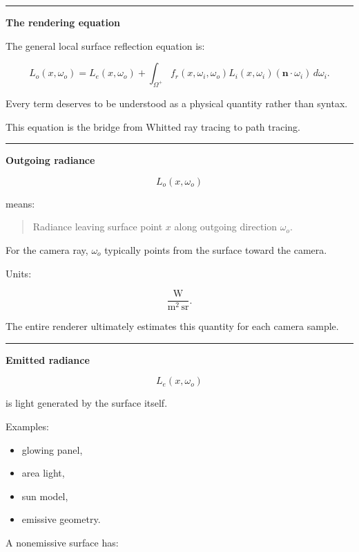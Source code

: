 \begin{center}\rule{0.5\linewidth}{0.5pt}\end{center}

\textbf{The rendering equation}

The general local surface reflection equation is:

\[
\boxed{
L_o(x,\omega_o)
=
L_e(x,\omega_o)
+
\int_{\Omega^+}
f_r(x,\omega_i,\omega_o)
L_i(x,\omega_i)
(\mathbf n\cdot\omega_i)
\,d\omega_i.
}
\]

Every term deserves to be understood as a physical quantity rather than syntax.

This equation is the bridge from Whitted ray tracing to path tracing.

\begin{center}\rule{0.5\linewidth}{0.5pt}\end{center}

\textbf{Outgoing radiance}

\[
L_o(x,\omega_o)
\]

means:

\begin{quote}
Radiance leaving surface point \(x\) along outgoing direction \(\omega_o\).
\end{quote}

For the camera ray, \(\omega_o\) typically points from the surface toward the camera.

Units:

\[
\frac{\mathrm W}
{\mathrm{m^2\,sr}}.
\]

The entire renderer ultimately estimates this quantity for each camera sample.

\begin{center}\rule{0.5\linewidth}{0.5pt}\end{center}

\textbf{Emitted radiance}

\[
L_e(x,\omega_o)
\]

is light generated by the surface itself.

Examples:

\begin{itemize}
\tightlist
\item
  glowing panel,
\item
  area light,
\item
  sun model,
\item
  emissive geometry.
\end{itemize}

A nonemissive surface has:

